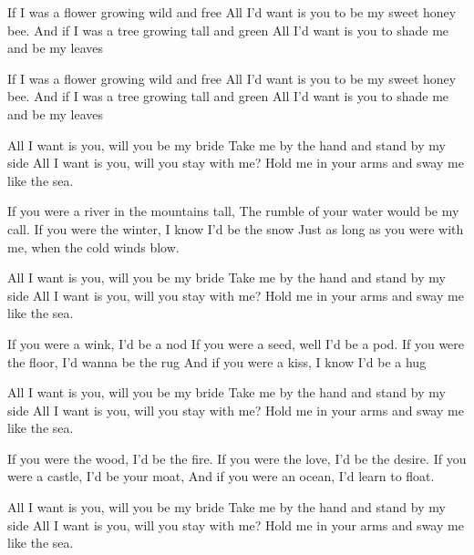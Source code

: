 \resetVars%
%
%
\MakeHeader%
\Lyrics%

If I was a flower growing wild and free
All I'd want is you to be my sweet honey bee.
And if I was a tree growing tall and green
All I'd want is you to shade me and be my leaves

If I was a flower growing wild and free
All I'd want is you to be my sweet honey bee.
And if I was a tree growing tall and green
All I'd want is you to shade me and be my leaves

All I want is you, will you be my bride
Take me by the hand and stand by my side
All I want is you, will you stay with me?
Hold me in your arms and sway me like the sea.

If you were a river in the mountains tall,
The rumble of your water would be my call.
If you were the winter, I know I'd be the snow
Just as long as you were with me, when the cold winds blow.

All I want is you, will you be my bride
Take me by the hand and stand by my side
All I want is you, will you stay with me?
Hold me in your arms and sway me like the sea.

If you were a wink, I'd be a nod
If you were a seed, well I'd be a pod.
If you were the floor, I'd wanna be the rug
And if you were a kiss, I know I'd be a hug

All I want is you, will you be my bride
Take me by the hand and stand by my side
All I want is you, will you stay with me?
Hold me in your arms and sway me like the sea.

\Continue
If you were the wood, I'd be the fire.
If you were the love, I'd be the desire.
If you were a castle, I'd be your moat,
And if you were an ocean, I'd learn to float.

All I want is you, will you be my bride
Take me by the hand and stand by my side
All I want is you, will you stay with me?
Hold me in your arms and sway me like the sea.

\Next%
